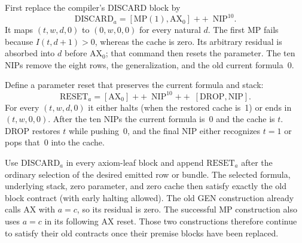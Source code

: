First replace the compiler's DISCARD block by
\[
 \mathrm{DISCARD}_a
   =[\mathrm{MP}(1),\mathrm{AX}_0]\;\mathbin{+\!+}\;
     \mathrm{NIP}^{10}.
\]
It maps $(t,w,d,0)$ to $(0,w,0,0)$ for every natural $d$.
The first MP fails because $I(t,d+1)>0$, whereas the cache is zero.
Its arbitrary residual is absorbed into $d$ before $\mathrm{AX}_0$;
that command then resets the parameter.  The ten NIPs remove the eight
rows, the generalization, and the old current formula~0.

Define a parameter reset that preserves the current formula and stack:
\[
 \mathrm{RESET}_a
  =[\mathrm{AX}_0]\;\mathbin{+\!+}\;
   \mathrm{NIP}^{10}\;\mathbin{+\!+}\;
   [\mathrm{DROP},\mathrm{NIP}].
\]
For every $(t,w,d,0)$ it either halts (when the restored cache is~1) or
ends in $(t,w,0,0)$.  After the ten NIPs the current formula is~0 and
the cache is $t$.  DROP restores $t$ while pushing~0, and the final NIP
either recognizes $t=1$ or pops that~0 into the cache.

Use $\mathrm{DISCARD}_a$ in every axiom-leaf block and append
$\mathrm{RESET}_a$ after the ordinary selection of the desired emitted
row or bundle.  The selected formula, underlying stack, zero parameter,
and zero cache then satisfy exactly the old block contract (with early
halting allowed).  The old GEN construction already calls AX with
$a=c$, so its residual is zero.  The successful MP construction also
uses $a=c$ in its following AX reset.  Those two constructions therefore
continue to satisfy their old contracts once their premise blocks have
been replaced.

